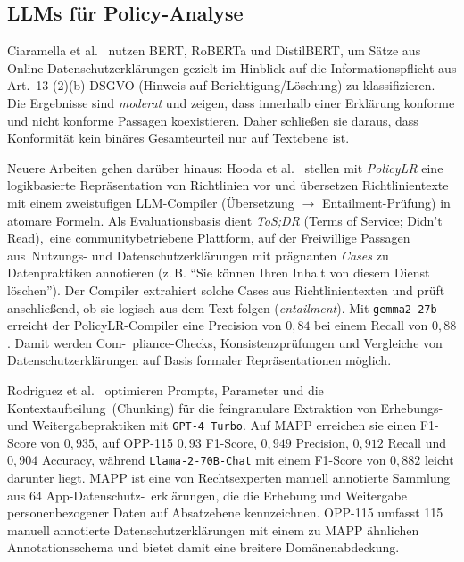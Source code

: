 \subsection*{\acp{LLM} für Policy-Analyse}

Ciaramella et al.\ \cite{ciaramella2022leveraging} nutzen BERT, RoBERTa und DistilBERT, um Sätze aus Online-Datenschutzerklärungen gezielt im Hinblick auf die Informationspflicht aus Art.~13 (2)(b) \ac{DSGVO} (Hinweis auf Berichtigung/Löschung) zu klassifizieren. Die Ergebnisse sind \emph{moderat} und zeigen, dass innerhalb einer Erklärung konforme und nicht konforme Passagen koexistieren. Daher schließen sie daraus, dass Konformität kein binäres Gesamteurteil nur auf Textebene ist.

Neuere Arbeiten gehen darüber hinaus: Hooda et al.\ \cite{hooda2024policylr} stellen mit \emph{PolicyLR} eine logikbasierte Repräsentation von Richtlinien vor und übersetzen Richtlinientexte mit einem zweistufigen \ac{LLM}-Compiler (Übersetzung $\to$ Entailment-Prüfung) in atomare Formeln. Als Evaluationsbasis dient \emph{ToS;DR} (Terms of Service; Didn’t Read),\linebreak~eine communitybetriebene Plattform, auf der Freiwillige Passagen aus\linebreak~Nutzungs- und Datenschutzerklärungen mit prägnanten \emph{Cases} zu Datenpraktiken annotieren (z.\,B. \enquote{Sie können Ihren Inhalt von diesem Dienst löschen}). Der Compiler extrahiert solche Cases aus Richtlinientexten und prüft anschließend, ob sie logisch aus dem Text folgen (\emph{entailment}). Mit \texttt{gemma2-27b} erreicht der PolicyLR-Compiler eine Precision von $0{,}84$ bei einem Recall von $0{,}88$. Damit werden Com-\linebreak~pliance-Checks, Konsistenzprüfungen und Vergleiche von Datenschutzerklärungen auf Basis formaler Repräsentationen möglich.

Rodriguez et al.\ \cite{rodriguez2024largelanguagemodels} optimieren Prompts, Parameter und die Kontextaufteilung\linebreak~(Chunking) für die feingranulare Extraktion von Erhebungs- und Weitergabepraktiken mit \texttt{GPT-4~Turbo}. Auf MAPP erreichen sie einen F1-Score von $0{,}935$, auf OPP-115 $0{,}93$ F1-Score, $0{,}949$ Precision, $0{,}912$ Recall und $0{,}904$ Accuracy, während \texttt{Llama-2-70B-Chat} mit einem F1-Score von $0{,}882$ leicht darunter liegt. MAPP ist eine von Rechtsexperten manuell annotierte Sammlung aus 64 App-Datenschutz-\linebreak~erklärungen, die die Erhebung und Weitergabe personenbezogener Daten auf Absatzebene kennzeichnen. OPP-115 umfasst 115 manuell annotierte Datenschutzerklärungen mit einem zu MAPP ähnlichen Annotationsschema und bietet damit eine breitere Domänenabdeckung.

